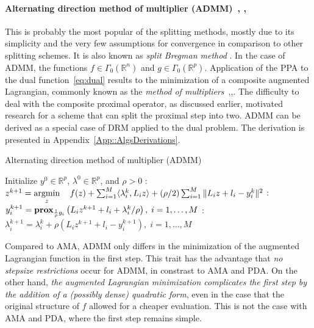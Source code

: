 \documentclass[openany]{now}
\newcommand{\reals}{{\mathbb R}}
\newcommand{\argmin}{\mathop{\rm argmin}}
\newcommand{\prox}{\mathop{\bf prox}}
\begin{document}
\paragraph{Alternating direction method of multiplier (ADMM)~\cite{GloMar}, \cite{GaMe}, \cite{Glowinski_Tallec}} This is probably the most popular of the splitting methods, mostly due to its simplicity and the very few assumptions for convergence in comparison to other splitting schemes. It is also known as \emph{split Bregman method} \cite{GoldsteinO09}. In the case of ADMM, the functions $f\in\Gamma_0(\reals^n)$ and $g\in\Gamma_0(\reals^p)$.
Application of the PPA to the dual function~\eqref{eq:dual} results to the minimization of a composite augmented Lagrangian, commonly known as the \emph{method of multipliers}~\cite{Hestenes},\cite{Powe69a},\cite{Bertsekas_AL}. The difficulty to deal with the composite proximal operator, as discussed earlier, motivated research for a scheme that can split the proximal step into two. ADMM can be derived as a special case of DRM applied to the dual problem. The derivation is presented in Appendix~\ref{App::AlgsDerivations}.
  \begin{algorithm}[H]
  \caption{Alternating direction method of multiplier (ADMM)}
  \label{al:ADMM}
  \begin{algorithmic} 
  \REQUIRE Initialize $y^{0}\in \reals^{p}$, $\lambda^{0}\in \reals^{p}$, and $\rho>0$
  \LOOP
  : $z^{k+1} = \argmin\limits_z \quad f(z) + \sum_{i=1}^M \langle  \lambda_i^k, L_i z\rangle  + (\rho/2)\sum_{i=1}^M\|L_i z + l_i - y_i^k\|^{2}$
  : $y_i^{k+1} = \prox_{\frac{1}{\rho}g_i}\left(L_iz^{k+1}+l_i+\lambda_i^k/\rho\right), \; i=1,\ldots,M$
  : $\lambda^{k+1}_i = \lambda_i^k + \rho(L_i z^{k+1} + l_i - y_i^{k+1}),\; i=1,\ldots,M$
  \ENDLOOP
  \end{algorithmic}
  \end{algorithm}\begin{footnotesize}
  \end{footnotesize}

Compared to AMA, ADMM only differs in the minimization of the augmented Lagrangian function in the first step. This trait has the advantage that \emph{no stepsize restrictions} occur for ADMM, in constrast to AMA and PDA. On the other hand, \emph{the augmented Lagrangian minimization complicates the first step by the addition of a (possibly dense) quadratic form}, even in the case that the original structure of $f$ allowed for a cheaper evaluation. This is not the case with AMA and PDA, where the first step remains simple.
\end{document}
